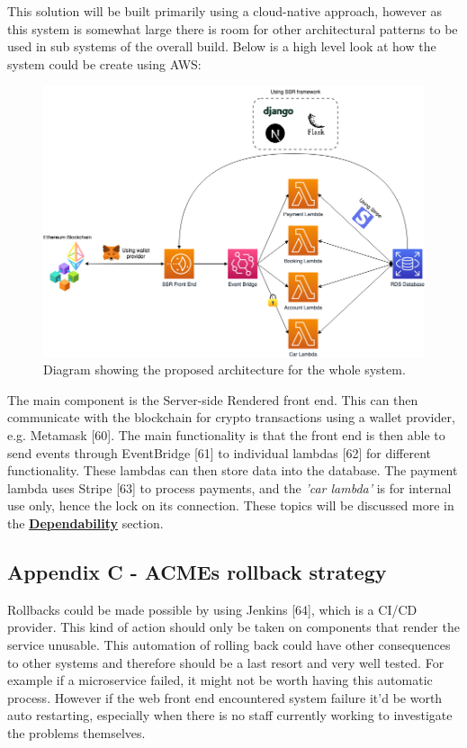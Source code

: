   This solution will be built primarily using a cloud-native approach, however as this system is somewhat large there is room for other 
  architectural patterns to be used in sub systems of the overall build. Below is a high level look at how the system could be create using AWS:

  \begin{figure}[H]
    \centering
    \includegraphics[width=12cm]{assets/architectureEvents.drawio.png}
    \caption{Diagram showing the proposed architecture for the whole system.}
    \label{fig:architecture}
  \end{figure}

  The main component is the Server-side Rendered front end. This can then communicate with the blockchain for crypto transactions using a wallet provider,
  e.g. Metamask [60]. The main functionality is that the front end is then able to send events through EventBridge [61] to individual lambdas [62] for different 
  functionality. These lambdas can then store data into the database. The payment lambda uses Stripe [63] to process payments, and the \textit{'car lambda'} is
  for internal use only, hence the lock on its connection. These topics will be discussed more in the 
  \hyperref[sec:Dependability]{\textbf{Dependability}} section.

\subsection{Appendix C - ACMEs rollback strategy}
\label{sec:AppendixC}

  Rollbacks could be made possible by using Jenkins [64], which is a CI/CD provider. This kind of action should only be taken on components that render the
  service unusable. This automation of rolling back could have other consequences to other systems and therefore should be a last resort and very well 
  tested. For example if a microservice failed, it might not be worth having this automatic process. However if the web front end encountered system failure 
  it'd be worth auto restarting, especially when there is no staff currently working to investigate the problems themselves.
  
